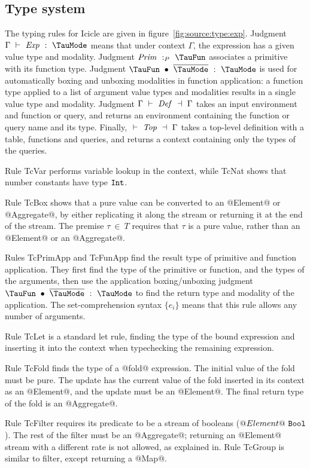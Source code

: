 \subsection{Type system}
The typing rules for Icicle are given in figure~\ref{fig:source:type:exp}.
Judgment $\Typecheck{\Gamma}{\mi{Exp}}{\TauMode}$ means that under context $\Gamma$, the expression has a given value type and modality.
Judgment $\TypecheckP{\mi{Prim}}{\TauFun}$ associates a primitive with its function type.
Judgment $\TypecheckApp{\TauFun}{\ov{\TauMode}}{\TauMode}$ is used for automatically boxing and unboxing modalities in function application: a function type applied to a list of argument value types and modalities results in a single value type and modality.
Judgment $\TypecheckS{\Gamma}{\mi{Def}}{\Gamma}$ takes an input environment and function or query, and returns an environment containing the function or query name and its type.
Finally, $\TypecheckS{}{\mi{Top}}{\Gamma}$ takes a top-level definition with a table, functions and queries, and returns a context containing only the types of the queries.

Rule TcVar performs variable lookup in the context, while TcNat shows that number constants have type $\mathtt{Int}$.

Rule TcBox shows that a pure value can be converted to an @Element@ or @Aggregate@, by either replicating it along the stream or returning it at the end of the stream.
The premise $\tau~\in~T$ requires that $\tau$ is a pure value, rather than an @Element@ or an @Aggregate@.

Rules TcPrimApp and TcFunApp find the result type of primitive and function application.
They first find the type of the primitive or function, and the types of the arguments, then use the application boxing/unboxing judgment $\TypecheckApp{\TauFun}{\ov{\TauMode}}{\TauMode}$ to find the return type and modality of the application.
The set-comprehension syntax $\{e_i\}$ means that this rule allows any number of arguments.

Rule TcLet is a standard let rule, finding the type of the bound expression and inserting it into the context when typechecking the remaining expression.

Rule TcFold finds the type of a @fold@ expression.
The initial value of the fold must be pure.
The update has the current value of the fold inserted in its context as an @Element@, and the update must be an @Element@.
The final return type of the fold is an @Aggregate@.

Rule TcFilter requires its predicate to be a stream of booleans ($@Element@~\mathtt{Bool}$).
The rest of the filter must be an @Aggregate@; returning an @Element@ stream with a different rate is not allowed, as explained in.
Rule TcGroup is similar to filter, except returning a @Map@.

